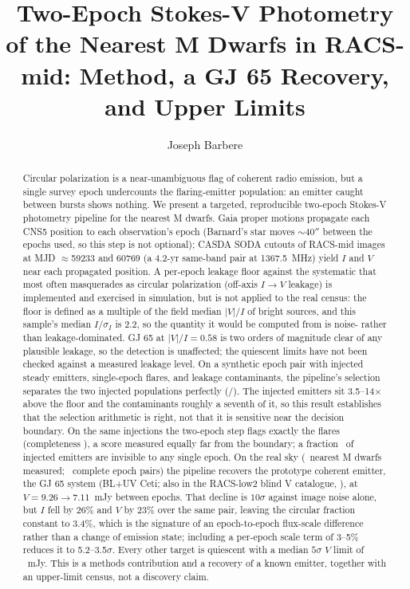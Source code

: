 \documentclass[twocolumn]{aastex631}
\begin{document}
\title{Two-Epoch Stokes-V Photometry of the Nearest M Dwarfs in RACS-mid:
Method, a GJ 65 Recovery, and Upper Limits}
\author[0009-0008-3289-4447]{Joseph Barbere}

\begin{abstract}
Circular polarization is a near-unambiguous flag of coherent radio emission, but a single survey
epoch undercounts the flaring-emitter population: an emitter caught between bursts shows
nothing. We present a targeted, reproducible two-epoch Stokes-V photometry pipeline for the
nearest M dwarfs. Gaia proper motions propagate each CNS5 \citep{golovin2023} position to each
observation's epoch (Barnard's star moves $\sim$40$''$ between the epochs used, so this step is
not optional); CASDA SODA cutouts of RACS-mid \citep{duchesne2023} images at MJD $\approx$59233 and
60769 (a 4.2-yr same-band pair at 1367.5~MHz) yield $I$ and $V$ near each propagated
position. A per-epoch leakage floor against the systematic that most often masquerades as circular
polarization (off-axis
$I\rightarrow V$ leakage) is implemented and exercised in simulation, but is not
applied to the real census: the floor is defined as a multiple of the field median $|V|/I$ of
bright sources, and this sample's median $I/\sigma_I$ is 2.2, so the quantity it would
be computed from is noise- rather than leakage-dominated. GJ 65 at $|V|/I = 0.58$ is two
orders of magnitude clear of any plausible leakage, so the detection is unaffected; the
quiescent limits have not been checked against a measured leakage level. On a synthetic epoch
pair with injected steady emitters, single-epoch flares, and leakage contaminants, the
pipeline's selection separates the two injected populations perfectly (\svdComp/\svdPur). The
injected emitters sit 3.5--14$\times$ above the floor and the contaminants roughly a seventh of
it, so this result establishes that the selection arithmetic is right, not that it is sensitive
near the decision boundary. On the same injections the two-epoch step flags exactly the
flares (completeness \svdVarComp), a score measured equally far from the boundary; a fraction \svdMissFrac\ of injected emitters are invisible to any single epoch.
On the real sky (\svdRealN\ nearest M dwarfs measured; \svdRealPairs\ complete epoch pairs) the
pipeline recovers the prototype coherent emitter, the GJ 65 system (BL+UV Ceti; also in the
RACS-low2 blind V catalogue, \citealt{racs8_2026}), at $V=9.26\rightarrow7.11$~mJy between
epochs. That decline is $10\sigma$ against image noise alone, but $I$ fell by 26\% and $V$ by
23\% over the same pair, leaving the circular fraction constant to 3.4\%, which is the signature
of an epoch-to-epoch flux-scale difference rather than a change of emission state; including a
per-epoch scale term of 3--5\% \citep{duchesne2023} reduces it to 5.2--3.5$\sigma$. Every other
target is quiescent with a median $5\sigma$ $V$ limit of \svdRealVlim~mJy. This is a methods
contribution and a recovery of a known emitter, together with an upper-limit census, not a
discovery claim.
\end{abstract}
\end{document}
